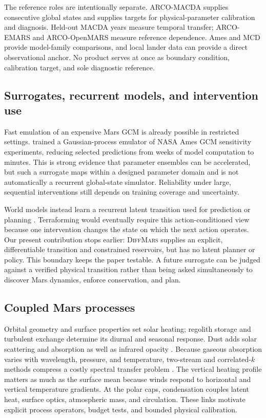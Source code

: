 \documentclass{article}
\newcommand{\model}{\textsc{DiffMars}}
\begin{document}
The reference roles are intentionally separate. ARCO-MACDA supplies consecutive
global states and supplies targets for physical-parameter calibration and
diagnosis. Held-out MACDA years measure temporal transfer; ARCO-EMARS and
ARCO-OpenMARS measure
reference dependence. Ames and MCD provide model-family comparisons, and local
lander data can provide a direct observational anchor. No product serves at once
as boundary condition, calibration target, and sole diagnostic reference.

\subsection{Surrogates, recurrent models, and intervention use}
Fast emulation of an expensive Mars GCM is already possible in restricted
settings. \citet{tunnell2023gp} trained a Gaussian-process emulator of NASA Ames
GCM sensitivity experiments, reducing selected predictions from weeks of model
computation to minutes. This is strong evidence that parameter ensembles can be
accelerated, but such a surrogate maps within a designed parameter domain and is
not automatically a recurrent global-state simulator. Reliability under large,
sequential interventions still depends on training coverage and uncertainty.

World models instead learn a recurrent latent transition used for prediction or
planning \citep{ha2018worldmodels}. Terraforming would eventually require this
action-conditioned view because one intervention changes the state on which the
next action operates. Our present contribution stops earlier: \model{} supplies
an explicit, differentiable transition and constrained reservoirs, but has no
latent planner or policy. This boundary keeps the paper testable. A future
surrogate can be judged against a verified physical transition rather than being
asked simultaneously to discover Mars dynamics, enforce conservation, and plan.

\subsection{Coupled Mars processes}
Orbital geometry and surface properties set solar heating; regolith storage and
turbulent exchange determine its diurnal and seasonal response. Dust adds solar
scattering and absorption as well as infrared opacity
\citep{madeleine2011dust}. Because gaseous absorption varies with wavelength,
pressure, and temperature, two-stream and correlated-\(k\) methods compress a
costly spectral transfer problem \citep{toon1989twostream}. The vertical heating
profile matters as much as the surface mean because winds respond to horizontal
and vertical temperature gradients. At the polar caps, condensation couples
latent heat, surface optics, atmospheric mass, and circulation. These links
motivate explicit process operators, budget tests, and bounded physical calibration.
\end{document}
